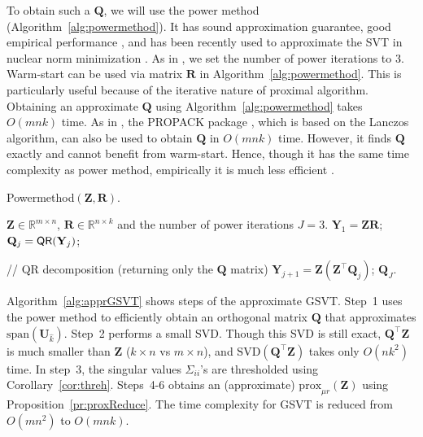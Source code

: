 \documentclass[10pt,journal,compsoc]{IEEEtran}
\def \R{\mathbb R}
\newcommand{\Prox}[2]{\text{prox}_{#1}(#2)}
\newcommand{\Span}[1]{\text{span}(#1)}
\newcommand{\QR}[1]{\text{\sf QR}( #1 )}
\begin{document}
To obtain such a 
$\mathbf{Q}$,
we will use the 
power method 
(Algorithm~\ref{alg:powermethod}).
It has sound approximation guarantee, good empirical performance
\cite{halko2011finding}, and
has been recently used 
to approximate the SVT in nuclear norm minimization 
\cite{hsieh2014nuclear,quan2015impute}.  
As in \cite{hsieh2014nuclear},
we set the number of power iterations to 3.
Warm-start can be used via matrix $\mathbf{R}$ in
Algorithm~\ref{alg:powermethod}. 
This is particularly useful because of the iterative nature of proximal algorithm.
Obtaining an approximate $\mathbf{Q}$ using Algorithm~\ref{alg:powermethod} takes $O(m n k)$ time.
As in \cite{toh2010accelerated,mazumder2010spectral}, the 
PROPACK package \cite{larsen1998lanczos},
which is based on the Lanczos
algorithm,
can also be used to obtain $\mathbf{Q}$ in $O(m n k)$ time.
However, it finds $\mathbf{Q}$ exactly and
cannot benefit from warm-start. Hence, though it has the same time complexity as 
power method, empirically it is much less efficient \cite{quan2015impute}.

\begin{algorithm}[ht]
\caption{\textsf{Powermethod}$(\mathbf{Z}, \mathbf{R})$.}
\begin{algorithmic}[1]
	\REQUIRE $\mathbf{Z} \in \R^{m \times n}$, $\mathbf{R} \in \R^{n \times k}$
	and the number of power iterations $J=3$.
	\STATE $\mathbf{Y}_1 = \mathbf{Z} \mathbf{R}$;
	\STATE $\mathbf{Q}_j = \QR{\mathbf{Y}_j}$;  
	
	// QR decomposition (returning only the $\mathbf{Q}$ matrix)
	\STATE $\mathbf{Y}_{j + 1} = \mathbf{Z} (\mathbf{Z}^{\top} \mathbf{Q}_j)$;
	\ENDFOR
	\RETURN $\mathbf{Q}_{J}$. 
\end{algorithmic}
\label{alg:powermethod}
\end{algorithm}

Algorithm~\ref{alg:apprGSVT} shows steps of the approximate GSVT.
Step~1 uses the power method to efficiently obtain an orthogonal matrix $\mathbf{Q}$ that approximates $\Span{\mathbf{U}_{\hat{k}}}$.
Step~2 
performs
a small SVD.
Though this SVD is still exact,
$\mathbf{Q}^{\top} \mathbf{Z}$ is much smaller than $\mathbf{Z}$ ($k \times n$ vs $m \times n$),
and
$\text{SVD}(\mathbf{Q}^{\top} \mathbf{Z})$
takes only $O(n k^2)$ time.
In step~3,
the singular values $\Sigma_{ii}$'s
are thresholded using Corollary~\ref{cor:threh}.
Steps~4-6 obtains an (approximate) $\Prox{\mu r}{\mathbf{Z}}$
using Proposition~\ref{pr:proxReduce}.
The time complexity for GSVT is reduced from $O(m n^2)$ 
to $O(m n k)$.
\end{document}
